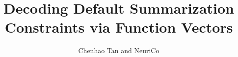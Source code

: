 \documentclass{article}
\title{Decoding Default Summarization Constraints via Function Vectors}
\author{Chenhao Tan and NeuriCo}
\begin{document}
\maketitle

\begin{abstract}

\end{abstract}









\end{document}

